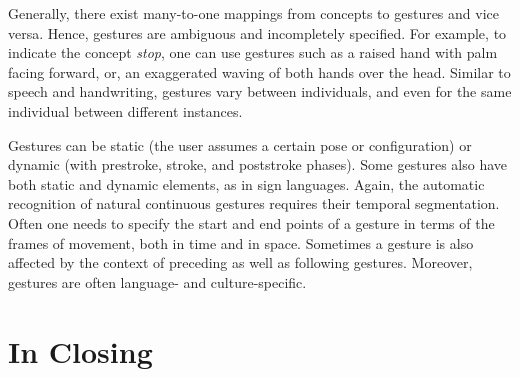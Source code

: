 Generally, there exist many-to-one mappings from concepts
to gestures and vice versa. Hence, gestures are ambiguous and
incompletely specified. For example, to indicate the concept
\textit{stop}, one can use gestures such as a raised hand with palm
facing forward, or, an exaggerated waving of both hands over the
head. Similar to speech and handwriting, gestures vary between
individuals, and even for the same individual between different
instances.

Gestures can be static (the user assumes a certain pose or configuration)
or dynamic (with prestroke, stroke, and poststroke
phases). Some gestures also have both static and dynamic elements,
as in sign languages. Again, the automatic recognition
of natural continuous gestures requires their temporal segmentation.
Often one needs to specify the start and end points of a
gesture in terms of the frames of movement, both in time and
in space. Sometimes a gesture is also affected by the context of
preceding as well as following gestures. Moreover, gestures are
often language- and culture-specific.


\section{In Closing}
